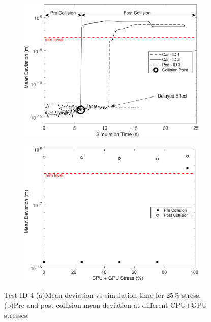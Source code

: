 \begin{figure}[h]
    \centering
    \begin{subfigure}{.49\textwidth}
        \includegraphics[width=1\textwidth]{Other/Figures/CarsPeopleCollsionsCG25.pdf}
        \caption{}
        \label{CarsPeopleCollsionsCG25}
    \end{subfigure}
    \begin{subfigure}{.49\textwidth}
        \includegraphics[width=1\textwidth]{Other/Figures/CarsPeopleCollisionPrePost.pdf}
        \caption{}
        \label{CarsPeopleCollisionPrePost}
    \end{subfigure}
    \caption{Test ID 4 (a)Mean deviation vs simulation time for 25\% stress. (b)Pre and post collision mean deviation at different CPU+GPU stresses.}
\end{figure}
